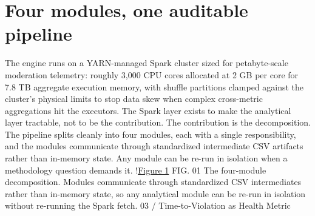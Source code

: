 \documentclass{obelus-preprint}
\begin{document}
\section{Four modules, one auditable pipeline}
The engine runs on a YARN-managed Spark cluster sized for petabyte-scale moderation telemetry: roughly 3,000 CPU cores allocated at 2 GB per core for 7.8 TB aggregate execution memory, with shuffle partitions clamped against the cluster's physical limits to stop data skew when complex cross-metric aggregations hit the executors. The Spark layer exists to make the analytical layer tractable, not to be the contribution.
The contribution is the decomposition. The pipeline splits cleanly into four modules, each with a single responsibility, and the modules communicate through standardized intermediate CSV artifacts rather than in-memory state. Any module can be re-run in isolation when a methodology question demands it.
!\href{fig_1.svg}{Figure 1}
FIG. 01 The four-module decomposition. Modules communicate through standardized CSV intermediates rather than in-memory state, so any analytical module can be re-run in isolation without re-running the Spark fetch.
03 / Time-to-Violation as Health Metric
\end{document}
